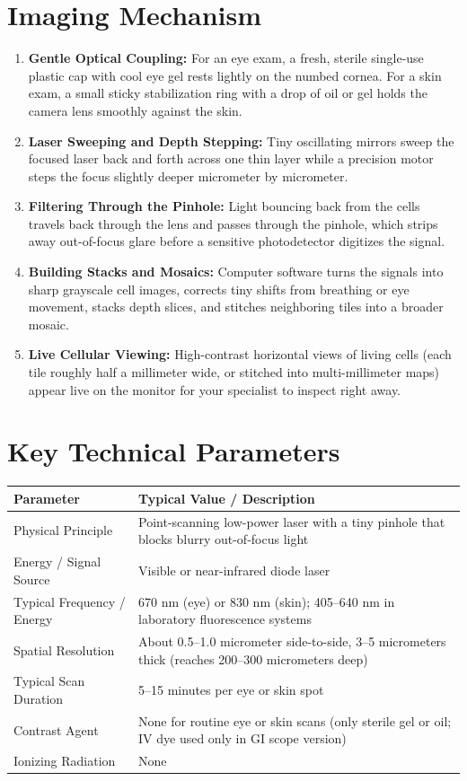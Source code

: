 \section{Imaging Mechanism}
\begin{enumerate}
    \item \textbf{Gentle Optical Coupling:} For an eye exam, a fresh, sterile single-use plastic cap with cool eye gel rests lightly on the numbed cornea. For a skin exam, a small sticky stabilization ring with a drop of oil or gel holds the camera lens smoothly against the skin.
    \item \textbf{Laser Sweeping and Depth Stepping:} Tiny oscillating mirrors sweep the focused laser back and forth across one thin layer while a precision motor steps the focus slightly deeper micrometer by micrometer.
    \item \textbf{Filtering Through the Pinhole:} Light bouncing back from the cells travels back through the lens and passes through the pinhole, which strips away out-of-focus glare before a sensitive photodetector digitizes the signal.
    \item \textbf{Building Stacks and Mosaics:} Computer software turns the signals into sharp grayscale cell images, corrects tiny shifts from breathing or eye movement, stacks depth slices, and stitches neighboring tiles into a broader mosaic.
    \item \textbf{Live Cellular Viewing:} High-contrast horizontal views of living cells (each tile roughly half a millimeter wide, or stitched into multi-millimeter maps) appear live on the monitor for your specialist to inspect right away.
\end{enumerate}

\section{Key Technical Parameters}
\noindent
\begin{tabularx}{\textwidth}{@{}l X@{}}
\toprule
\textbf{Parameter} & \textbf{Typical Value / Description} \\
\midrule
Physical Principle & Point-scanning low-power laser with a tiny pinhole that blocks blurry out-of-focus light \\
Energy / Signal Source & Visible or near-infrared diode laser \\
Typical Frequency / Energy & 670 nm (eye) or 830 nm (skin); 405--640 nm in laboratory fluorescence systems \\
Spatial Resolution & About 0.5--1.0 micrometer side-to-side, 3--5 micrometers thick (reaches 200--300 micrometers deep) \\
Typical Scan Duration & 5--15 minutes per eye or skin spot \\
Contrast Agent & None for routine eye or skin scans (only sterile gel or oil; IV dye used only in GI scope version) \\
Ionizing Radiation & None \\
\bottomrule
\end{tabularx}

